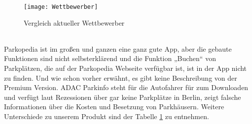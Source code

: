 \documentclass[12pt,ngerman, fleqn]{book} %
\begin{document}
\begin{figure}[ht]
    \centering
    \texttt{[image: Wettbewerber]}
    \caption{Vergleich aktueller Wettbewerber}
    \label{fig:Wettbewerber}
\end{figure} \\
Parkopedia ist im großen und ganzen eine ganz gute App, aber die gebaute Funktionen sind nicht selbsterklärend und die Funktion „Buchen“ von Parkplätzen, die auf der Parkopedia Webseite verfügbar ist, ist in der App nicht zu finden. Und wie schon vorher erwähnt, es gibt keine Beschreibung von der Premium Version. ADAC Parkinfo steht für die Autofahrer für  zum Downloaden und verfügt laut Rezessionen über gar keine Parkplätze in Berlin, zeigt falsche Informationen über die Kosten und Besetzung von Parkhäusern\autocite{googleplay}. Weitere Unterschiede zu unserem Produkt sind der Tabelle \ref{fig:Wettbewerber} zu entnehmen.
\end{document}
